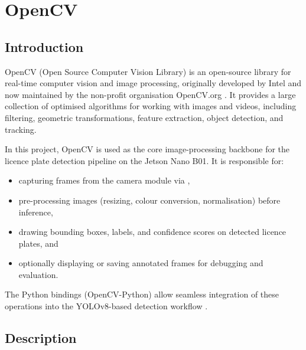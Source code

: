 %
%
%
\newpage
\section{OpenCV}


\subsection{Introduction} 

OpenCV (Open Source Computer Vision Library) is an open-source library for real-time computer vision and image processing, originally developed by Intel and now maintained by the non-profit organisation OpenCV.org \cite{Bradski:2000,opencv_wiki}. It provides a large collection of optimised algorithms for working with images and videos, including filtering, geometric transformations, feature extraction, object detection, and tracking.

In this project, OpenCV is used as the core image-processing backbone for the licence plate detection pipeline on the Jetson Nano B01. It is responsible for:
\begin{itemize}
	\item capturing frames from the camera module via ,
	\item pre-processing images (resizing, colour conversion, normalisation) before inference,
	\item drawing bounding boxes, labels, and confidence scores on detected licence plates, and
	\item optionally displaying or saving annotated frames for debugging and evaluation.
\end{itemize}
The Python bindings (OpenCV-Python) allow seamless integration of these operations into the YOLOv8-based detection workflow \cite{opencv_py_intro}.


\subsection{Description}

